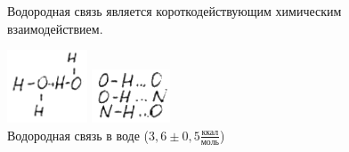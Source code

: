\begin{lecture}
	\begin{lecSection}
	\begin{figure}[H]
	Водородная связь является короткодействующим химическим взаимодействием.
	\begin{minipage}[h]{0.2\linewidth}
		\centering\includegraphics[width=\linewidth]{lecture_07/new_pic2}
		\caption{Водородная связь в воде ($3,6 \pm 0,5 \frac{\text{ккал}}{\textbf{моль}}$)}
	\end{minipage}
	\hfill
	\begin{minipage}[h]{0.2\linewidth}
		\centering\includegraphics[width=\linewidth]{lecture_07/new_pic3}

\end{minipage}
\end{figure}
\end{lecSection}
\end{lecture}

